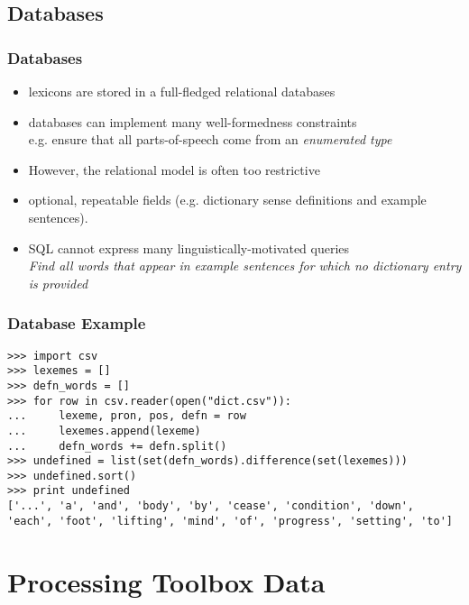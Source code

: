\documentclass{beamer}             %
\begin{document}
\subsection{Databases}

\begin{frame}
\frametitle{Databases}
\begin{itemize}
  \item lexicons are stored in a full-fledged relational databases
  \item databases can implement many well-formedness constraints\\
    e.g. ensure that all parts-of-speech come from an
    \textit{enumerated type}
  \item However, the relational model is often too restrictive
  \item optional, repeatable fields (e.g.
    dictionary sense definitions and example sentences).
  \item SQL cannot express many linguistically-motivated queries\\
    \textit{Find all words that appear in example sentences for which no dictionary entry is provided}
\end{itemize}
\end{frame}

\begin{frame}[fragile]
\frametitle{Database Example}  
\scriptsize

\begin{verbatim}
>>> import csv
>>> lexemes = []
>>> defn_words = []
>>> for row in csv.reader(open("dict.csv")):
...     lexeme, pron, pos, defn = row
...     lexemes.append(lexeme)
...     defn_words += defn.split()
>>> undefined = list(set(defn_words).difference(set(lexemes)))
>>> undefined.sort()
>>> print undefined
['...', 'a', 'and', 'body', 'by', 'cease', 'condition', 'down',
'each', 'foot', 'lifting', 'mind', 'of', 'progress', 'setting', 'to']
\end{verbatim}
\end{frame}

\section{Processing Toolbox Data}
\end{document}
